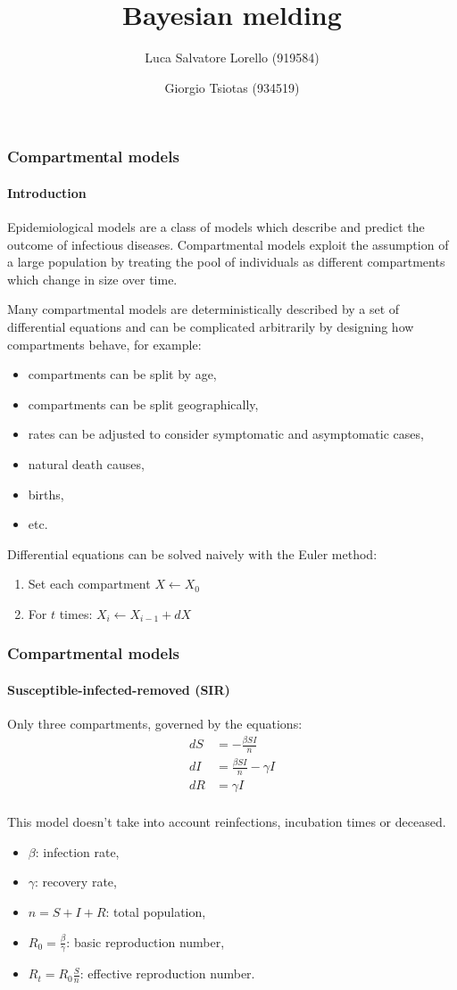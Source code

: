 \documentclass[aspectratio=43]{beamer}
\title{Bayesian melding}
\author{Luca Salvatore Lorello (919584)\and Giorgio Tsiotas (934519)}
\begin{document}
\begin{frame}
\titlepage
\end{frame}

\begin{frame}
	\frametitle{Compartmental models}
	\framesubtitle{Introduction}
{\small 	Epidemiological models are a class of models which describe and predict the outcome of infectious diseases. Compartmental models exploit the assumption of a large population by treating the pool of individuals as different compartments which change in size over time.
	
	Many compartmental models are deterministically described by a set of differential equations and can be complicated arbitrarily by designing how compartments behave, for example:}
	\begin{itemize}
		\item compartments can be split by age,
		\item compartments can be split geographically,
		\item rates can be adjusted to consider symptomatic and asymptomatic cases,
		\item natural death causes,
		\item births,
		\item etc.
	\end{itemize}
{\small 	Differential equations can be solved naively with the Euler method:}
\begin{enumerate}
	\item Set each compartment $X \leftarrow X_0$
	\item For $t$ times: $X_{i} \leftarrow X_{i-1} + dX$
	
\end{enumerate}
	
\end{frame}

\begin{frame}
	\frametitle{Compartmental models}
	\framesubtitle{Susceptible-infected-removed (SIR)}
	Only three compartments, governed by the equations:
	\begin{align*}
		dS &= -\frac{\beta S I}{n}\\
		dI &= \frac{\beta S I}{n} - \gamma I\\
		dR &= \gamma I\\
	\end{align*}
	
	This model doesn't take into account reinfections, incubation times or deceased.
	
	\begin{itemize}
		\item $\beta$: infection rate,
		\item $\gamma$: recovery rate,
		\item $n = S + I + R$: total population,
		\item $R_0 = \frac{\beta}{\gamma}$: basic reproduction number,
		\item $R_t = R_0 \frac{S}{n}$: effective reproduction number.
	\end{itemize}
\end{frame}
\end{document}
